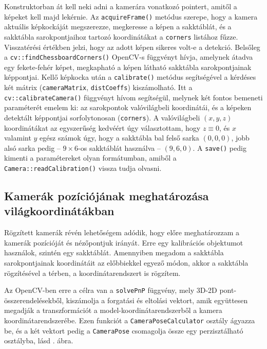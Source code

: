 Konstruktorban át kell neki adni a kamerára vonatkozó pointert, amitől a képeket kell majd lekérnie. Az \texttt{acquireFrame()} metódus szerepe, hogy a kamera aktuális képkockáját megszerezze, megkeresse a képen a sakktáblát, és a sakktábla sarokpontjaihoz tartozó koordinátákat a \texttt{corners} listához fűzze. Visszatérési értékben jelzi, hogy az adott képen sikeres volt-e a detekció. Belsőleg a \texttt{cv::findChessboardCorners()} OpenCV-s függvényt hívja, amelynek átadva egy fekete-fehér képet, megkapható a képen látható sakktábla sarokpontjainak képpontjai. Kellő képkocka után a \texttt{calibrate()} metódus segítségével a kérdéses két mátrix (\texttt{cameraMatrix}, \texttt{distCoeffs}) kiszámolható. Itt a \texttt{cv::calibrateCamera()} függvényt hívom segítségül, melynek két fontos bemeneti paraméterét emelem ki: az sarokpontok valóvilágbeli koordinátái, és a képeken detektált képpontjai sorfolytonosan (\texttt{corners}). A valóvilágbeli $(x, y, z)$ koordinátákat az egyszerűség kedvéért úgy választottam, hogy $z \equiv 0$, és $x$ valamint $y$ egész számok úgy, hogy a sakktábla bal felső sarka $(0, 0, 0)$, jobb alsó sarka pedig -- $9\times 6$-os sakktáblát használva -- $(9, 6, 0)$. A \texttt{save()} pedig kimenti a paramétereket olyan formátumban, amiből a \texttt{Camera::readCalibration()} vissza tudja olvasni.


\subsection{Kamerák pozíciójának meghatározása világkoordinátákban}


Rögzített kamerák révén lehetőségem adódik, hogy előre meghatározzam a kamerák pozícióját és nézőpontjuk irányát. Erre egy kalibrációs objektumot használok, szintén egy sakktáblát. Amennyiben megadom a sakktábla sarokpontjainak koordinátáit az előbbiekkel egyező módon, akkor a sakktábla rögzítésével a térben, a koordinátarendszert is rögzítem. 

Az OpenCV-ben erre a célra van a \texttt{solvePnP} függvény, mely 3D-2D pont-összerendelésekből, kiszámolja a forgatási és eltolási vektort, amik együttesen megadják a transzformációt a model-koordinátarendszerből a kamera koordinátarendszerébe. Ezen funkciót a \texttt{CameraPoseCalculator} osztály ágyazza be, és a két vektort pedig a \texttt{CameraPose} csomagolja össze egy perzisztálható osztályba, lásd . ábra.

